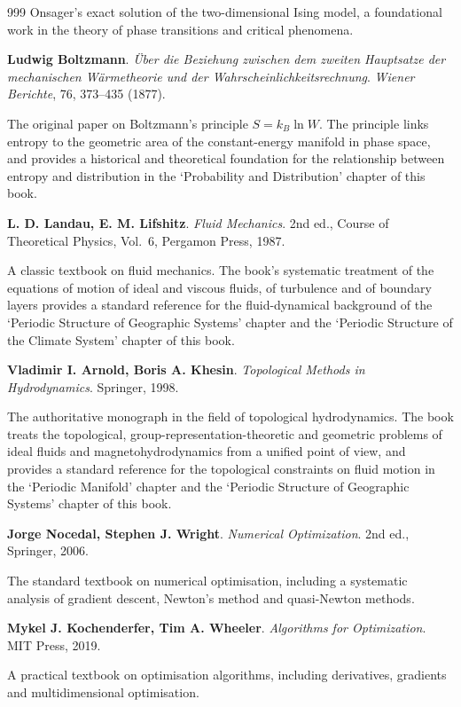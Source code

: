 \begin{thebibliography}{999}
Onsager's exact solution of the two-dimensional Ising model, a foundational work in the theory of phase transitions and critical phenomena.

 \textbf{Ludwig Boltzmann}. \textit{\"Uber die Beziehung zwischen dem zweiten Hauptsatze der mechanischen W\"armetheorie und der Wahrscheinlichkeitsrechnung}. \textit{Wiener Berichte}, 76, 373--435 (1877).

The original paper on Boltzmann's principle $S = k_B \ln W$. The principle links entropy to the geometric area of the constant-energy manifold in phase space, and provides a historical and theoretical foundation for the relationship between entropy and distribution in the `Probability and Distribution' chapter of this book.

 \textbf{L. D. Landau, E. M. Lifshitz}. \textit{Fluid Mechanics}. 2nd ed., Course of Theoretical Physics, Vol.~6, Pergamon Press, 1987.

A classic textbook on fluid mechanics. The book's systematic treatment of the equations of motion of ideal and viscous fluids, of turbulence and of boundary layers provides a standard reference for the fluid-dynamical background of the `Periodic Structure of Geographic Systems' chapter and the `Periodic Structure of the Climate System' chapter of this book.

 \textbf{Vladimir I. Arnold, Boris A. Khesin}. \textit{Topological Methods in Hydrodynamics}. Springer, 1998.

The authoritative monograph in the field of topological hydrodynamics. The book treats the topological, group-representation-theoretic and geometric problems of ideal fluids and magnetohydrodynamics from a unified point of view, and provides a standard reference for the topological constraints on fluid motion in the `Periodic Manifold' chapter and the `Periodic Structure of Geographic Systems' chapter of this book.

 \textbf{Jorge Nocedal, Stephen J. Wright}. \textit{Numerical Optimization}. 2nd ed., Springer, 2006.

The standard textbook on numerical optimisation, including a systematic analysis of gradient descent, Newton's method and quasi-Newton methods.

 \textbf{Mykel J. Kochenderfer, Tim A. Wheeler}. \textit{Algorithms for Optimization}. MIT Press, 2019.

A practical textbook on optimisation algorithms, including derivatives, gradients and multidimensional optimisation.


\end{thebibliography}
